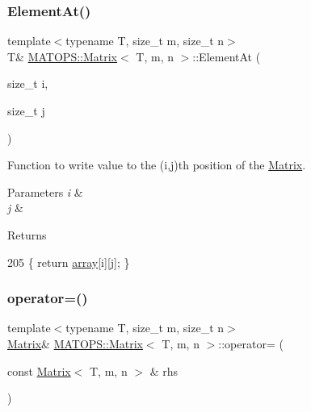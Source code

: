 \subsubsection{\texorpdfstring{Element\+At()}{ElementAt()}\hspace{0.1cm}{\footnotesize\ttfamily [2/2]}}
{\footnotesize\ttfamily template$<$typename T, size\+\_\+t m, size\+\_\+t n$>$ \\
T\& \hyperlink{classMATOPS_1_1Matrix}{M\+A\+T\+O\+P\+S\+::\+Matrix}$<$ T, m, n $>$\+::Element\+At (\begin{DoxyParamCaption}\item[{size\+\_\+t}]{i,  }\item[{size\+\_\+t}]{j }\end{DoxyParamCaption})\hspace{0.3cm}{\ttfamily [inline]}}



Function to write value to the (i,j)th position of the \hyperlink{classMATOPS_1_1Matrix}{Matrix}. 


\begin{DoxyParams}{Parameters}
{\em i} & \\
\hline
{\em j} & \\
\hline
\end{DoxyParams}
\begin{DoxyReturn}{Returns}

\end{DoxyReturn}

\begin{DoxyCode}
205                                 \{ \textcolor{keywordflow}{return} \hyperlink{classMATOPS_1_1Matrix_af2a995c9d251f109d54040e2732a93f0}{array}[i][j]; \}
\end{DoxyCode}
\mbox{\label{classMATOPS_1_1Matrix_a4512ee518878124f54e3c596d2847d86}} 
\subsubsection{\texorpdfstring{operator=()}{operator=()}}
{\footnotesize\ttfamily template$<$typename T, size\+\_\+t m, size\+\_\+t n$>$ \\
\hyperlink{classMATOPS_1_1Matrix}{Matrix}\& \hyperlink{classMATOPS_1_1Matrix}{M\+A\+T\+O\+P\+S\+::\+Matrix}$<$ T, m, n $>$\+::operator= (\begin{DoxyParamCaption}\item[{const \hyperlink{classMATOPS_1_1Matrix}{Matrix}$<$ T, m, n $>$ \&}]{rhs }\end{DoxyParamCaption})\hspace{0.3cm}{\ttfamily [inline]}}



